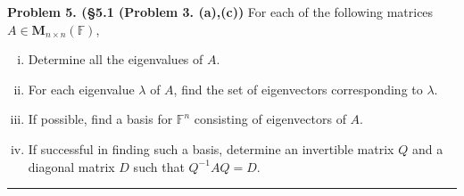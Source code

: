 \documentclass[leqno]{article}
\theoremstyle{nonumberplain}
\begin{document}
\pagebreak





\noindent\textbf{Problem 5. (\S 5.1 (Problem 3. (a),(c))}  For each of the following matrices $A\in \mathbf{M}_{n\times n}(\mathbb{F})$,
\begin{enumerate}[(i)]
\item Determine all the eigenvalues of $A$.
\item For each eigenvalue $\lambda$ of $A$, find the set of eigenvectors corresponding to $\lambda$.
\item If possible, find a basis for $\mathbb{F}^n$ consisting of eigenvectors of $A$.
\item If successful in finding such a basis, determine an invertible matrix $Q$ and a diagonal matrix $D$ such that $Q^{-1}AQ=D$.
\end{enumerate}

\noindent\rule[0.5ex]{\linewidth}{1pt}
\end{document}
